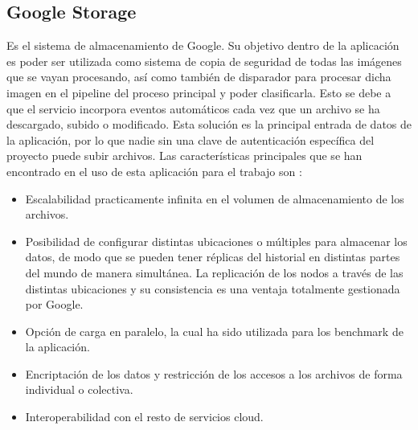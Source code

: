 \subsection{Google Storage}\label{subsec:storage}
Es el sistema de almacenamiento de Google.
Su objetivo dentro de la aplicación es poder ser utilizada como sistema de copia de seguridad de todas las imágenes que se vayan procesando, así como también de disparador para procesar dicha imagen en el pipeline del proceso principal y poder clasificarla.
Esto se debe a que el servicio incorpora eventos automáticos cada vez que un archivo se ha descargado, subido o modificado.
Esta solución es la principal entrada de datos de la aplicación, por lo que nadie sin una clave de autenticación específica del proyecto puede subir archivos.
Las características principales que se han encontrado en el uso de esta aplicación para el trabajo son :
\begin{itemize}
    \item Escalabilidad practicamente infinita en el volumen de almacenamiento de los archivos.
    \item Posibilidad de configurar distintas ubicaciones o múltiples para almacenar los datos, de modo que se pueden tener réplicas del historial en distintas partes del mundo de manera simultánea.
    La replicación de los nodos a través de las distintas ubicaciones y su consistencia es una ventaja totalmente gestionada por Google.
    \item Opción de carga en paralelo, la cual ha sido utilizada para los benchmark de la aplicación.
    \item Encriptación de los datos y restricción de los accesos a los archivos de forma individual o colectiva.
    \item Interoperabilidad con el resto de servicios cloud.
\end{itemize}

